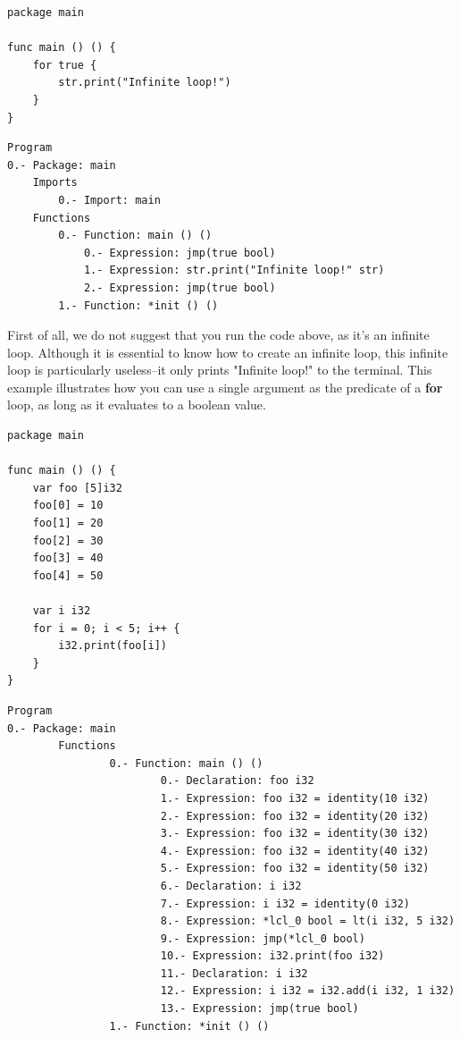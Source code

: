 \documentclass[11pt,fleqn,openany]{book} %
\begin{document}
\begin{lstlisting}[caption={Infinite loop example},captionpos=b,label={listing:infinite-loop-example}]
package main

func main () () {
	for true {
		str.print("Infinite loop!")
	}
}
\end{lstlisting}

\begin{lstlisting}[caption={Abstract syntax tree of listing \ref{listing:infinite-loop-example}},captionpos=b,label={listing:infinite-loop-example-ast}]
Program
0.- Package: main
	Imports
		0.- Import: main
	Functions
		0.- Function: main () ()
			0.- Expression: jmp(true bool)
			1.- Expression: str.print("Infinite loop!" str)
			2.- Expression: jmp(true bool)
		1.- Function: *init () ()
\end{lstlisting}

First of all, we do not suggest that you run the code above, as it's an infinite loop. Although it is essential to know how to create an infinite loop, this infinite loop is particularly useless--it only prints "Infinite loop!" to the terminal. This example illustrates how you can use a single argument as the predicate of a \textbf{for} loop, as long as it evaluates to a boolean value.

\begin{lstlisting}[caption={Traditional syntax of 'for' loop},captionpos=b,label={listing:traditional-syntax-of-for-loop}]
package main

func main () () {
	var foo [5]i32
	foo[0] = 10
	foo[1] = 20
	foo[2] = 30
	foo[3] = 40
	foo[4] = 50

	var i i32
	for i = 0; i < 5; i++ {
		i32.print(foo[i])
	}
}
\end{lstlisting}

\begin{lstlisting}[caption={Abstract syntax tree of listing \ref{listing:traditional-syntax-of-for-loop}},captionpos=b,label={listing:traditional-syntax-of-for-loop-ast}]
Program
0.- Package: main
        Functions
                0.- Function: main () ()
                        0.- Declaration: foo i32
                        1.- Expression: foo i32 = identity(10 i32)
                        2.- Expression: foo i32 = identity(20 i32)
                        3.- Expression: foo i32 = identity(30 i32)
                        4.- Expression: foo i32 = identity(40 i32)
                        5.- Expression: foo i32 = identity(50 i32)
                        6.- Declaration: i i32
                        7.- Expression: i i32 = identity(0 i32)
                        8.- Expression: *lcl_0 bool = lt(i i32, 5 i32)
                        9.- Expression: jmp(*lcl_0 bool)
                        10.- Expression: i32.print(foo i32)
                        11.- Declaration: i i32
                        12.- Expression: i i32 = i32.add(i i32, 1 i32)
                        13.- Expression: jmp(true bool)
                1.- Function: *init () ()
\end{lstlisting}
\end{document}

